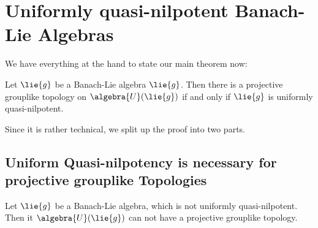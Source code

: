 \documentclass[
11pt,                          %
english                        %
]{article}
\begin{document}
\section{Uniformly quasi-nilpotent Banach-Lie Algebras}

We have everything at the hand to state our main theorem now:
\begin{theorem}
	\label{thm:main}
	Let $\lie{g}$ be a Banach-Lie algebra $\lie{g}$. Then there is a projective 
	grouplike topology on $\algebra{U}(\lie{g})$ if and only if $\lie{g}$ is 
	uniformly quasi-nilpotent.
\end{theorem}
Since it is rather technical, we split up the proof into two parts.


\subsection{Uniform Quasi-nilpotency is necessary for projective grouplike 
Topologies}
\begin{proposition}
	\label{prop:mainthm_part_1}
	Let $\lie{g}$ be a Banach-Lie algebra, which is not uniformly 
	quasi-nilpotent. Then it $\algebra{U}(\lie{g})$ can not have a projective 
	grouplike topology.
\end{proposition}
\end{document}
